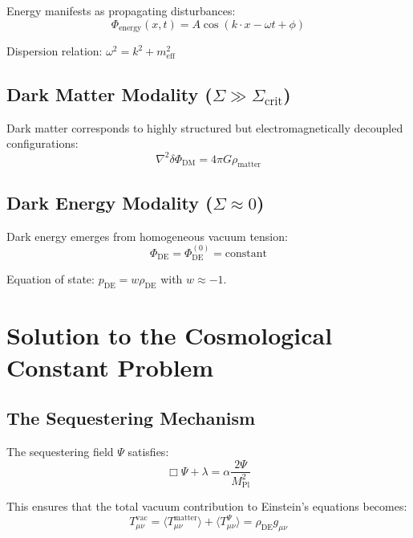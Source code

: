 \documentclass[12pt,a4paper]{article}
\newcommand{\structuring}{\Sigma}
\newcommand{\planck}{M_{\text{Pl}}}
\newcommand{\sequester}{\Psi}
\begin{document}
Energy manifests as propagating disturbances:
\begin{equation}
\Phi_{\text{energy}}(x,t) = A \cos(k \cdot x - \omega t + \phi)
\end{equation}

Dispersion relation: $\omega^2 = k^2 + m_{\text{eff}}^2$

\subsection{Dark Matter Modality ($\structuring \gg \structuring_{\text{crit}}$)}

Dark matter corresponds to highly structured but electromagnetically decoupled configurations:
\begin{equation}
\nabla^2 \delta\Phi_{\text{DM}} = 4\pi G \rho_{\text{matter}}
\end{equation}

\subsection{Dark Energy Modality ($\structuring \approx 0$)}

Dark energy emerges from homogeneous vacuum tension:
\begin{equation}
\Phi_{\text{DE}} = \Phi_{\text{DE}}^{(0)} = \text{constant}
\end{equation}

Equation of state: $p_{\text{DE}} = w \rho_{\text{DE}}$ with $w \approx -1$.

\section{Solution to the Cosmological Constant Problem}

\subsection{The Sequestering Mechanism}

The sequestering field $\sequester$ satisfies:
\begin{equation}
\Box \sequester + \lambda = \alpha \frac{2\sequester}{\planck^2}
\label{eq:sequester_eom}
\end{equation}

This ensures that the total vacuum contribution to Einstein's equations becomes:
\begin{equation}
T_{\mu\nu}^{\text{vac}} = \langle T_{\mu\nu}^{\text{matter}} \rangle + \langle T_{\mu\nu}^{\sequester} \rangle = \rho_{\text{DE}} g_{\mu\nu}
\end{equation}
\end{document}
